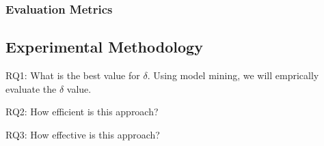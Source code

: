 \subsubsection{Evaluation Metrics}

\subsection{Experimental Methodology}
RQ1: What is the best value for $\delta$.
Using model mining, we will emprically evaluate the $\delta$ value.

RQ2: How efficient is this approach?

RQ3: How effective is this approach?















